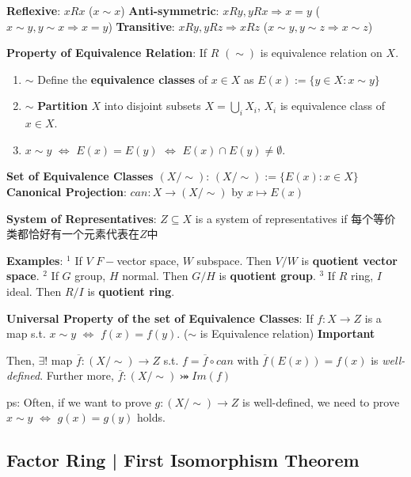 \documentclass[9pt]{article}
\begin{document}
\quad \textbf{Reflexive}: $xRx$ {\scriptsize ($x\sim x$)} \quad \textbf{Anti-symmetric}: $xRy,yRx\Rightarrow x = y$ {\scriptsize ($x\sim y,y\sim x\Rightarrow x=y$)} \quad \textbf{Transitive}: $xRy,yRz\Rightarrow xRz$ {\scriptsize ($x\sim y,y\sim z\Rightarrow x\sim z$)}

\textbf{Property of Equivalence Relation}: If $R$ $(\sim)$ is equivalence relation on $X$.

\begin{enumerate}[itemsep=-2pt, topsep=-2pt]
    \item $\sim$ Define the \textbf{equivalence classes} of $x\in X$ as $E(x):=\{y\in X:x\sim y\}$
    \item $\sim$ \textbf{Partition} $X$ into disjoint subsets $X=\bigcup_{i}X_i$, $X_i$ is equivalence class of $x\in X$.
    \item $x\sim y$ \quad $\Leftrightarrow$ \quad $E(x)=E(y)$ \quad $\Leftrightarrow$ \quad $E(x)\cap E(y)\ne\emptyset$.
\end{enumerate}

\textbf{Set of Equivalence Classes $(X/\sim)$}: $(X/\sim):=\{E(x):x\in X\}$ \qquad \textbf{Canonical Projection}: $can:X\to (X/\sim)$ by $x\mapsto E(x)$

\quad \textbf{System of Representatives}: $Z\subseteq X$ is a system of representatives if {\footnotesize 每个等价类都恰好有一个元素代表在$Z$中}

\quad \textbf{Examples}: {\tiny $^1$ If $V$ $F-$vector space, $W$ subspace. Then $V/W$ is \textbf{quotient vector space}. \quad $^2$ If $G$ group, $H$ normal. Then $G/H$ is \textbf{quotient group}. \quad $^3$ If $R$ ring, $I$ ideal. Then $R/I$ is \textbf{quotient ring}.}

\textbf{Universal Property of the set of Equivalence Classes}: If $f:X\to Z$ is a map s.t. $x\sim y$ $\Leftrightarrow$ $f(x)=f(y)$. {\tiny ($\sim$ is Equivalence relation) \textbf{Important}}

\quad Then, $\exists!$ map $\overline{f}:(X/\sim)\to Z$ s.t. $f=\overline{f}\circ can$ \quad with \quad $\overline{f}(E(x))=f(x)$ is \textit{well-defined}. \qquad Further more, $\overline{f}:(X/\sim)\bij Im(f)$

\quad ps: Often, if we want to prove $g:(X/\sim)\to Z$ is well-defined, we need to prove $x\sim y$ $\Leftrightarrow$ $g(x)=g(y)$ holds.


\subsection{Factor Ring | First Isomorphism Theorem} %
\end{document}
